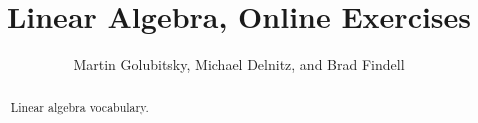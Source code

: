 \documentclass[numbers,nooutcomes,twoside,hints]{xourse}
\title{Linear Algebra, Online Exercises}
\author{Martin Golubitsky, Michael Delnitz, and Brad Findell}
\begin{document}
\begin{abstract}
Linear algebra vocabulary.  
\end{abstract}
\maketitle


\end{document}
